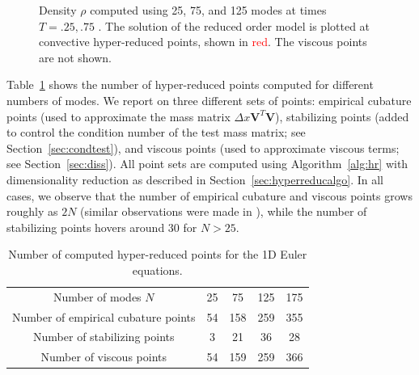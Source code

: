 \documentclass[preprint,10pt]{elsarticle}
\theoremstyle{definition}
\theoremstyle{lemma}
\theoremstyle{theorem}
\theoremstyle{assumption}
\newcommand{\bnote}[1]{{\color{blue}{#1}}}
\begin{document}
\begin{figure}[!h]
\caption{Density $\rho$ computed using 25, 75, and 125 modes at times $T=.25, .75$ \bnote{for $\epsilon = 2e-4$}.  The solution of the reduced order model is plotted at convective hyper-reduced points, shown in \textcolor{red}{red}.  The viscous points are not shown.}
\label{fig:romsols}
\end{figure}

Table~\ref{tab:hrpts} shows the number of hyper-reduced points computed for different numbers of modes.  We report on three different sets of points: empirical cubature points (used to approximate the mass matrix $\Delta x \bm{V}^T\bm{V}$), stabilizing points (added to control the condition number of the test mass matrix; see Section~\ref{sec:condtest}), and viscous points (used to approximate viscous terms; see Section~\ref{sec:diss}).  All point sets are computed using Algorithm~\ref{alg:hr} with dimensionality reduction as described in Section~\ref{sec:hyperreducalgo}.  In all cases, we observe that the number of empirical cubature and viscous points grows roughly as $2N$ (similar observations were made in \cite{hernandez2017dimensional}), while the number of stabilizing points hovers around $30$ for $N > 25$.  

\begin{table}[!h]
\centering
\begin{tabular}{|c || c | c | c |c |}
\hline
Number of modes $N$ & 25 & 75 & 125 & 175\\
\hhline{|=|=|=|=|=|}
Number of empirical cubature points &54 & 158 & 259 &355 \\
\hline
Number of stabilizing points & 3& 21 & 36 & 28 \\
\hline
Number of viscous points & 54 &159 & 259 & 366  \\
\hline
\end{tabular}
\caption{Number of computed hyper-reduced points for the 1D Euler equations.}
\label{tab:hrpts}
\end{table}
\end{document}
